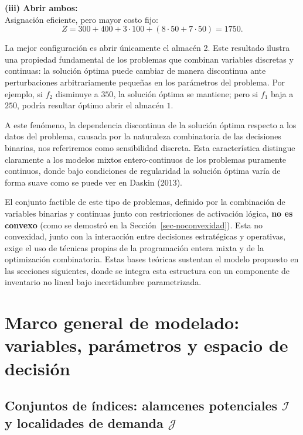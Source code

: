 \documentclass[
  spanish,
  us-letterpaper,
]{scrreprt}
\numberwithin{equation}{section}
\begin{document}
\textbf{(iii) Abrir ambos:}\\
Asignación eficiente, pero mayor costo fijo:\\
\[
Z = 300 + 400 + 3\cdot 100 + (8\cdot 50 + 7\cdot 50)=1750.
\]

La mejor configuración es abrir únicamente el almacén 2. Este resultado
ilustra una propiedad fundamental de los problemas que combinan
variables discretas y continuas: la solución óptima puede cambiar de
manera discontinua ante perturbaciones arbitrariamente pequeñas en los
parámetros del problema. Por ejemplo, si \(f_2\) disminuye a \(350\), la
solución óptima se mantiene; pero si \(f_1\) baja a \(250\), podría
resultar óptimo abrir el almacén \(1\).

A este fenómeno, la dependencia discontinua de la solución óptima
respecto a los datos del problema, causada por la naturaleza
combinatoria de las decisiones binarias, nos referiremos como
sensibilidad discreta. Esta característica distingue claramente a los
modelos mixtos entero-continuos de los problemas puramente continuos,
donde bajo condiciones de regularidad la solución óptima varía de forma
suave como se puede ver en Daskin (2013).

El conjunto factible de este tipo de problemas, definido por la
combinación de variables binarias y continuas junto con restricciones de
activación lógica, \textbf{no es convexo} (como se demostró en la
Sección~\ref{sec-noconvexidad}). Esta no convexidad, junto con la
interacción entre decisiones estratégicas y operativas, exige el uso de
técnicas propias de la programación entera mixta y de la optimización
combinatoria. Estas bases teóricas sustentan el modelo propuesto en las
secciones siguientes, donde se integra esta estructura con un componente
de inventario no lineal bajo incertidumbre parametrizada.

\section{Marco general de modelado: variables, parámetros y espacio de
decisión}\label{marco-general-de-modelado-variables-paruxe1metros-y-espacio-de-decisiuxf3n}

\subsection{\texorpdfstring{Conjuntos de índices: alamcenes potenciales
\(\mathcal{I}\) y localidades de demanda
\(\mathcal{J}\)}{Conjuntos de índices: alamcenes potenciales \textbackslash mathcal\{I\} y localidades de demanda \textbackslash mathcal\{J\}}}\label{conjuntos-de-uxedndices-alamcenes-potenciales-mathcali-y-localidades-de-demanda-mathcalj}
\end{document}
